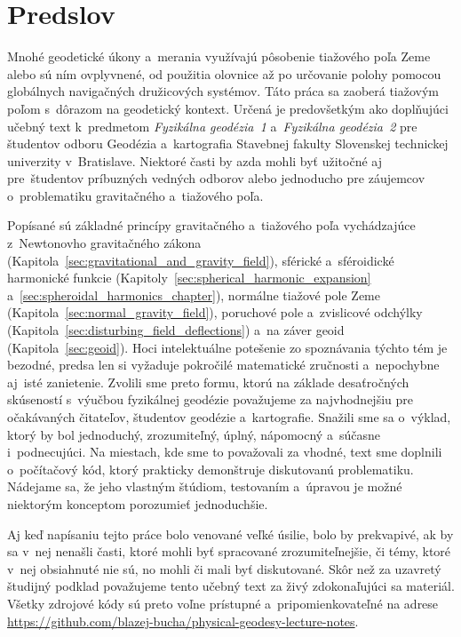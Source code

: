 \documentclass[a4paper,12pt]{book}
\begin{document}

\chapter*{Predslov}

Mnohé geodetické úkony a~merania využívajú pôsobenie tiažového poľa Zeme alebo 
sú ním ovplyvnené, od použitia olovnice až po určovanie polohy pomocou 
globálnych navigačných družicových systémov.  Táto práca sa zaoberá tiažovým 
poľom s~dôrazom na geodetický kontext.  Určená je predovšetkým ako doplňujúci 
učebný text k~predmetom \emph{Fyzikálna geodézia~1} a~\emph{Fyzikálna 
geodézia~2} pre študentov odboru Geodézia a~kartografia Stavebnej fakulty 
Slovenskej technickej univerzity v~Bratislave.  Niektoré časti by azda mohli 
byť užitočné aj pre~študentov príbuzných vedných odborov alebo jednoducho pre 
záujemcov o~problematiku gravitačného a~tiažového poľa.

Popísané sú základné princípy gravitačného a~tiažového poľa vychádzajúce 
z~Newtonovho gravitačného zákona 
(Kapitola~\ref{sec:gravitational_and_gravity_field}), sférické a~sféroidické 
harmonické funkcie (Kapitoly~\ref{sec:spherical_harmonic_expansion} 
a~\ref{sec:spheroidal_harmonics_chapter}), normálne tiažové pole Zeme 
(Kapitola~\ref{sec:normal_gravity_field}), poruchové pole a~zvislicové odchýlky 
(Kapitola~\ref{sec:disturbing_field_deflections}) a~na záver geoid 
(Kapitola~\ref{sec:geoid}).  Hoci intelektuálne potešenie zo spoznávania týchto 
tém je bezodné, predsa len si vyžaduje pokročilé matematické zručnosti 
a~nepochybne aj~isté zanietenie.  Zvolili sme preto formu, ktorú na základe 
desaťročných skúseností s~výučbou fyzikálnej geodézie považujeme za 
najvhodnejšiu pre očakávaných čitateľov, študentov geodézie a~kartografie.  
Snažili sme sa o~výklad, ktorý by bol jednoduchý, zrozumiteľný, úplný, 
nápomocný a~súčasne i~podnecujúci.  Na miestach, kde sme to považovali za 
vhodné, text sme doplnili o~počítačový kód, ktorý prakticky demonštruje 
diskutovanú problematiku.  Nádejame sa, že jeho vlastným štúdiom, testovaním 
a~úpravou je možné niektorým konceptom porozumieť jednoduchšie.

Aj keď napísaniu tejto práce bolo venované veľké úsilie, bolo by prekvapivé, ak 
by sa v~nej nenašli časti, ktoré mohli byť spracované zrozumiteľnejšie, či 
témy, ktoré v~nej obsiahnuté nie sú, no mohli či mali byť diskutované.  Skôr 
než za uzavretý študijný podklad považujeme tento učebný text za živý 
zdokonaľujúci sa materiál.  Všetky zdrojové kódy sú preto voľne prístupné 
a~pripomienkovateľné na adrese 
\url{https://github.com/blazej-bucha/physical-geodesy-lecture-notes}.
\end{document}
